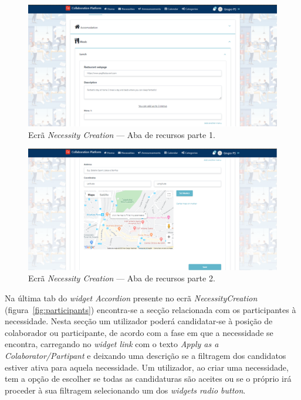 \begin{figure}[H]
  \centering 
  \includegraphics[scale=0.4]{figures/Resources1.png}
  \caption{Ecrã \textit{Necessity Creation} --- Aba de recursos parte 1.}\label{fig:Resources1}
\end{figure}



\begin{figure}[H]
  \centering 
  \includegraphics[scale=0.4]{figures/Resources2.png}
  \caption{Ecrã \textit{Necessity Creation} --- Aba de recursos parte 2.}\label{fig:Resources2}
\end{figure}


Na última tab do \textit{widget Accordion} presente no ecrã \textit{NecessityCreation} (figura~\ref{fig:participants}) encontra-se a secção relacionada com os participantes à necessidade. 
Nesta secção um utilizador poderá candidatar-se à posição de colaborador ou participante, de acordo com a fase em que a necessidade se encontra, carregando no \textit{widget link} com o texto \textit{Apply as a Colaborator/Partipant} e deixando uma descrição se a filtragem dos candidatos estiver ativa para aquela necessidade.
Um utilizador, ao criar uma necessidade, tem a opção de escolher se todas as candidaturas são aceites ou se o próprio irá proceder à sua filtragem selecionando um dos \textit{widgets radio button}.  

